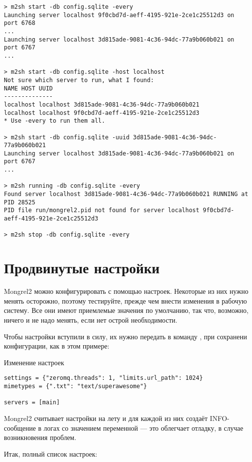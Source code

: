 \begin{Verbatim}
> m2sh start -db config.sqlite -every
Launching server localhost 9f0cbd7d-aeff-4195-921e-2ce1c25512d3 on port 6768
...
Launching server localhost 3d815ade-9081-4c36-94dc-77a9b060b021 on port 6767
...

> m2sh start -db config.sqlite -host localhost
Not sure which server to run, what I found:
NAME HOST UUID
--------------
localhost localhost 3d815ade-9081-4c36-94dc-77a9b060b021
localhost localhost 9f0cbd7d-aeff-4195-921e-2ce1c25512d3
* Use -every to run them all.

> m2sh start -db config.sqlite -uuid 3d815ade-9081-4c36-94dc-77a9b060b021
Launching server localhost 3d815ade-9081-4c36-94dc-77a9b060b021 on port 6767
...

> m2sh running -db config.sqlite -every
Found server localhost 3d815ade-9081-4c36-94dc-77a9b060b021 RUNNING at PID 28525
PID file run/mongrel2.pid not found for server localhost 9f0cbd7d-aeff-4195-921e-2ce1c25512d3

> m2sh stop -db config.sqlite -every
\end{Verbatim}

\section{Продвинутые настройки}

Mongrel2 можно конфигурировать с помощью настроек. Некоторые из них
нужно менять осторожно, поэтому тестируйте, прежде чем внести
изменения в рабочую систему. Все они имеют приемлемые значения по
умолчанию, так что, возможно, ничего и не надо менять, если нет острой
необходимости.

Чтобы настройки вступили в силу, их нужно передать в команду
, при сохранени конфигурации, как в этом примере:

\begin{code}{Изменение настроек}
\begin{lstlisting}
settings = {"zeromq.threads": 1, "limits.url_path": 1024}
mimetypes = {".txt": "text/superawesome"}

servers = [main]
\end{lstlisting}
\end{code}

Mongrel2 считывает настройки на лету и для каждой из них создаёт
INFO-сообщение в логах со значением переменной --- это облегчает
отладку, в случае возникновения проблем.

Итак, полный список настроек:

